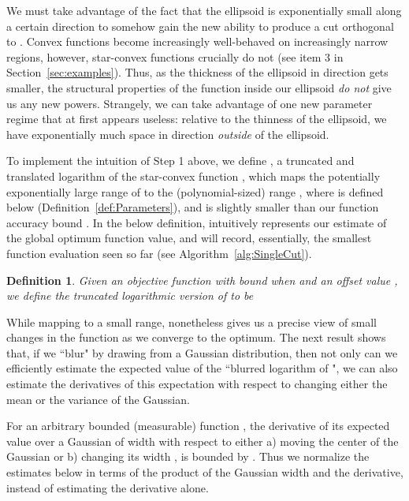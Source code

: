 \documentclass[11pt,letter]{article}
\newcounter{nTheorems}
\numberwithin{nTheorems}{section}
\newtheorem{definition}[nTheorems]{Definition}
\begin{document}
\begin{enumerate}
We must take advantage of the fact that the ellipsoid is exponentially small along a certain direction  to somehow gain the new ability to produce a cut orthogonal to .
Convex functions become increasingly well-behaved on increasingly narrow regions, however, star-convex functions crucially do not (see item 3 in Section~\ref{sec:examples}).
Thus, as the thickness of the ellipsoid in direction  gets smaller, the structural properties of the function inside our ellipsoid \emph{do not} give us any new powers.
Strangely, we can take advantage of one new parameter regime that at first appears useless: relative to the thinness of the ellipsoid, we have exponentially much space in direction  \emph{outside} of the ellipsoid.
\end{enumerate}

To implement the intuition of Step 1 above, we define , a truncated and translated logarithm of the star-convex function , which maps the potentially exponentially large range of  to the (polynomial-sized) range , where  is defined below (Definition~\ref{def:Parameters}), and is slightly smaller than our function accuracy bound . In the below definition,  intuitively represents our estimate of the global optimum function value, and will record, essentially, the smallest function evaluation seen so far (see Algorithm~\ref{alg:SingleCut}).

\begin{definition}
\label{def:BlurredLog}
Given an objective function  with bound  when  and an offset value , we define the \emph{truncated logarithmic version of } to be

\end{definition}

While mapping to a small range,  nonetheless gives us a precise view of small changes in the function as we converge to the optimum. The next result shows that, if we ``blur"  by drawing  from a Gaussian distribution, then not only can we efficiently estimate the expected value of the ``blurred logarithm of ", we can also estimate the derivatives of this expectation with respect to changing either the mean or the variance of the Gaussian.

For an arbitrary bounded (measurable) function , the derivative of its expected value over a Gaussian of width  with respect to either a) moving the center of the Gaussian or b) changing its width , is bounded by . Thus we normalize the estimates below in terms of the product of the Gaussian width and the derivative, instead of estimating the derivative alone.
\end{document}
